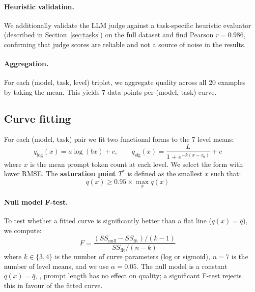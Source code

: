 \paragraph{Heuristic validation.}
We additionally validate the LLM judge against a task-specific heuristic
evaluator (described in Section~\ref{sec:tasks}) on the full dataset and find
Pearson $r = 0.986$, confirming that judge scores are reliable and not a
source of noise in the results.

\paragraph{Aggregation.}
For each (model, task, level) triplet, we aggregate quality across all 20
examples by taking the mean.
This yields 7 data points per (model, task) curve.

\subsection{Curve fitting}
\label{sec:fitting}

For each (model, task) pair we fit two functional forms to the 7 level means:
\begin{equation}
  q_{\log}(x) = a \log(bx) + c, \qquad
  q_{\text{sig}}(x) = \frac{L}{1 + e^{-k(x - x_0)}} + c
  \label{eq:curves}
\end{equation}
where $x$ is the mean prompt token count at each level.
We select the form with lower RMSE.
The \textbf{saturation point} $T^*$ is defined as the smallest $x$ such that:
\begin{equation}
  q(x) \geq 0.95 \times \max_{x} q(x)
  \label{eq:satpoint}
\end{equation}

\paragraph{Null model F-test.}
To test whether a fitted curve is significantly better than a flat line
($q(x) = \bar{q}$), we compute:
\begin{equation}
  F = \frac{(SS_{\text{null}} - SS_{\text{fit}}) / (k - 1)}{SS_{\text{fit}} / (n - k)}
  \label{eq:ftest}
\end{equation}
where $k \in \{3, 4\}$ is the number of curve parameters (log or sigmoid),
$n = 7$ is the number of level means, and we use $\alpha = 0.05$.
The null model is a constant $q(x) = \bar{q}$, \ie, prompt length has no
effect on quality; a significant F-test rejects this in favour of the fitted
curve.


